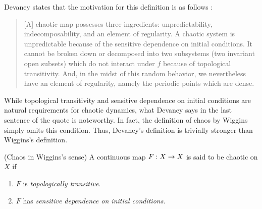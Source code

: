 \documentclass[12pt,draft,twoside]{book}
\begin{document}
Devaney states that the motivation for this definition is as follows \citep[p.50]{devaney}:
\begin{quotation}
  [A] chaotic map possesses three ingredients:
  unpredictability, indecomposability, and an element of regularity.
  A chaotic system is unpredictable because of the sensitive dependence on initial conditions.
  It cannot be broken down or decomposed into two subsystems (two invariant open subsets) which do not interact under $f$ because of topological transitivity.
    And, in the midst of this random behavior, we nevertheless have an element of regularity, namely the periodic points which are dense.
\end{quotation}
While topological transitivity and sensitive dependence on initial conditions are natural requirements for chaotic dynamics, what Devaney says in the last sentence of the quote is noteworthy.
In fact, the definition of chaos by Wiggins simply omits this condition.
Thus, Devaney's definition is trivially stronger than Wiggins's definition.
\begin{definition}
  (Chaos in Wiggins's sense)
  A continuous map $F: X\rightarrow X$ is said to be chaotic on $X$ if
  \begin{enumerate}
    \item $F$ is \textit{topologically transitive}.
    \item $F$ has \textit{sensitive dependence on initial conditions}.
  \end{enumerate}
\end{definition}
\end{document}
